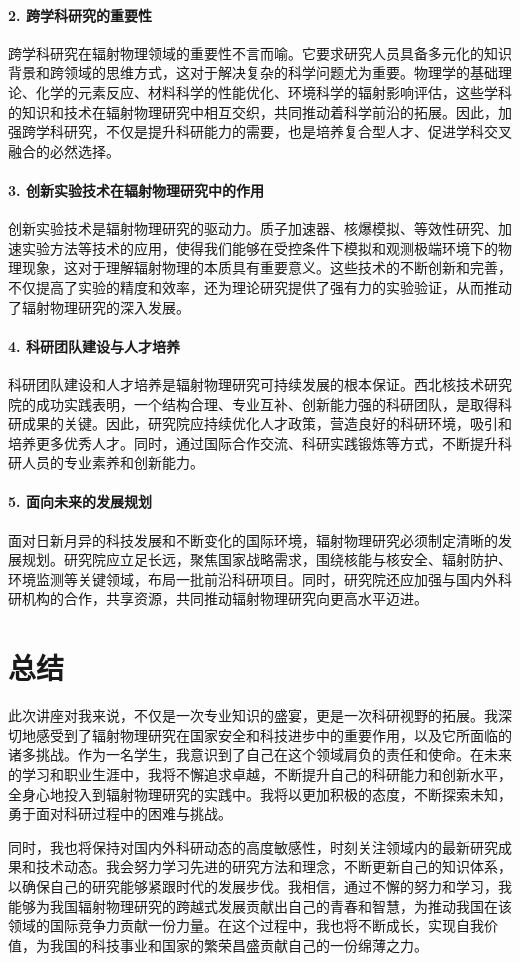 \documentclass[UTF8]{ctexart}
\begin{document}
\paragraph{2. 跨学科研究的重要性}
跨学科研究在辐射物理领域的重要性不言而喻。它要求研究人员具备多元化的知识背景和跨领域的思维方式，这对于解决复杂的科学问题尤为重要。物理学的基础理论、化学的元素反应、材料科学的性能优化、环境科学的辐射影响评估，这些学科的知识和技术在辐射物理研究中相互交织，共同推动着科学前沿的拓展。因此，加强跨学科研究，不仅是提升科研能力的需要，也是培养复合型人才、促进学科交叉融合的必然选择。

\paragraph{3. 创新实验技术在辐射物理研究中的作用}
创新实验技术是辐射物理研究的驱动力。质子加速器、核爆模拟、等效性研究、加速实验方法等技术的应用，使得我们能够在受控条件下模拟和观测极端环境下的物理现象，这对于理解辐射物理的本质具有重要意义。这些技术的不断创新和完善，不仅提高了实验的精度和效率，还为理论研究提供了强有力的实验验证，从而推动了辐射物理研究的深入发展。

\paragraph{4. 科研团队建设与人才培养}
科研团队建设和人才培养是辐射物理研究可持续发展的根本保证。西北核技术研究院的成功实践表明，一个结构合理、专业互补、创新能力强的科研团队，是取得科研成果的关键。因此，研究院应持续优化人才政策，营造良好的科研环境，吸引和培养更多优秀人才。同时，通过国际合作交流、科研实践锻炼等方式，不断提升科研人员的专业素养和创新能力。

\paragraph{5. 面向未来的发展规划}
面对日新月异的科技发展和不断变化的国际环境，辐射物理研究必须制定清晰的发展规划。研究院应立足长远，聚焦国家战略需求，围绕核能与核安全、辐射防护、环境监测等关键领域，布局一批前沿科研项目。同时，研究院还应加强与国内外科研机构的合作，共享资源，共同推动辐射物理研究向更高水平迈进。

\section{总结}

此次讲座对我来说，不仅是一次专业知识的盛宴，更是一次科研视野的拓展。我深切地感受到了辐射物理研究在国家安全和科技进步中的重要作用，以及它所面临的诸多挑战。作为一名学生，我意识到了自己在这个领域肩负的责任和使命。在未来的学习和职业生涯中，我将不懈追求卓越，不断提升自己的科研能力和创新水平，全身心地投入到辐射物理研究的实践中。我将以更加积极的态度，不断探索未知，勇于面对科研过程中的困难与挑战。

同时，我也将保持对国内外科研动态的高度敏感性，时刻关注领域内的最新研究成果和技术动态。我会努力学习先进的研究方法和理念，不断更新自己的知识体系，以确保自己的研究能够紧跟时代的发展步伐。我相信，通过不懈的努力和学习，我能够为我国辐射物理研究的跨越式发展贡献出自己的青春和智慧，为推动我国在该领域的国际竞争力贡献一份力量。在这个过程中，我也将不断成长，实现自我价值，为我国的科技事业和国家的繁荣昌盛贡献自己的一份绵薄之力。
\end{document}
